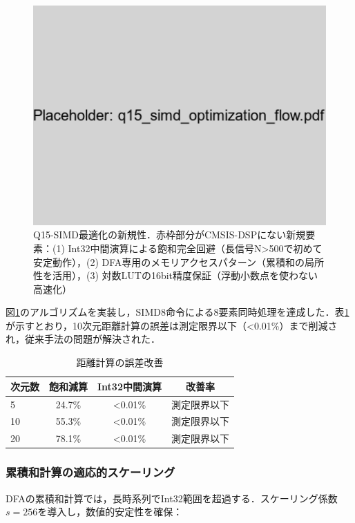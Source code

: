 \documentclass[paper]{ieicej}
\begin{document}
\begin{figure}[t]
\centering
\includegraphics[width=0.85\linewidth]{q15_simd_optimization_flow.pdf}
\caption{Q15-SIMD最適化の新規性．赤枠部分がCMSIS-DSPにない新規要素：(1) Int32中間演算による飽和完全回避（長信号N>500で初めて安定動作），(2) DFA専用のメモリアクセスパターン（累積和の局所性を活用），(3) 対数LUTの16bit精度保証（浮動小数点を使わない高速化）}
\label{fig:flowchart}
\end{figure}

図\ref{fig:flowchart}のアルゴリズムを実装し，SIMD8命令による8要素同時処理を達成した．表\ref{tab:distance_error}が示すとおり，10次元距離計算の誤差は測定限界以下（<0.01\%）まで削減され，従来手法の問題が解決された．

\begin{table}[t]
\caption{距離計算の誤差改善}
\label{tab:distance_error}
\centering
\begin{tabular}{lccc}
\toprule
次元数 & 飽和減算 & Int32中間演算 & 改善率 \\
\midrule
5 & 24.7\% & <0.01\% & 測定限界以下 \\
10 & 55.3\% & <0.01\% & 測定限界以下 \\
20 & 78.1\% & <0.01\% & 測定限界以下 \\
\bottomrule
\end{tabular}
\end{table}

\subsubsection{累積和計算の適応的スケーリング}
DFAの累積和計算では，長時系列でInt32範囲を超過する．スケーリング係数$s=256$を導入し，数値的安定性を確保：
\end{document}
